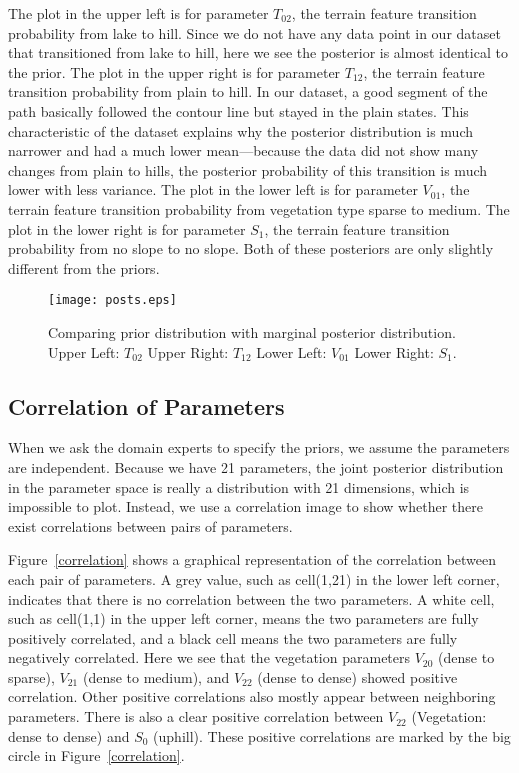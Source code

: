 The plot in the upper left is for parameter $T_{02}$, the terrain feature transition probability from lake to hill. Since we do not have any data point in our dataset that transitioned from lake to hill, here we see the posterior is almost identical to the prior. The plot in the upper right is for parameter $T_{12}$, the terrain feature transition probability from plain to hill. In our dataset, a good segment of the path basically followed the contour line but stayed in the plain states. This characteristic of the dataset explains why the posterior distribution is much narrower and had a much lower mean---because the data did not show many changes from plain to hills, the posterior probability of this transition is much lower with less variance. The plot in the lower left is for parameter $V_{01}$, the terrain feature transition probability from vegetation type sparse to medium. The plot in the lower right is for parameter $S_1$, the terrain feature transition probability from no slope to no slope. Both of these posteriors are only slightly different from the priors.
\begin{figure}
\centering
\texttt{[image: posts.eps]}
\caption[Comparing prior distribution with marginal posterior distribution]{Comparing prior distribution with marginal posterior distribution. Upper Left: $T_{02}$ Upper Right: $T_{12}$ Lower Left: $V_{01}$ Lower Right: $S_1$.}
\label{posts}
\end{figure}

\subsection{Correlation of Parameters}
\label{sec:4.3}

When we ask the domain experts to specify the priors, we assume the parameters are independent. Because we have 21 parameters, the joint posterior distribution in the parameter space is really a distribution with 21 dimensions, which is impossible to plot. Instead, we use a correlation image to show whether there exist correlations between pairs of parameters.

Figure~\ref{correlation} shows a graphical representation of the correlation between each pair of parameters. A grey value, such as cell(1,21) in the lower left corner, indicates that there is no correlation between the two parameters. A white cell, such as cell(1,1) in the upper left corner, means the two parameters are fully positively correlated, and a black cell means the two parameters are fully negatively correlated. Here we see that the vegetation parameters $V_{20}$ (dense to sparse), $V_{21}$ (dense to medium), and $V_{22}$ (dense to dense) showed positive correlation. Other positive correlations also mostly appear between neighboring parameters. There is also a clear positive correlation between $V_{22}$ (Vegetation: dense to dense) and $S_{0}$ (uphill). These positive correlations are marked by the big circle in Figure~\ref{correlation}.

